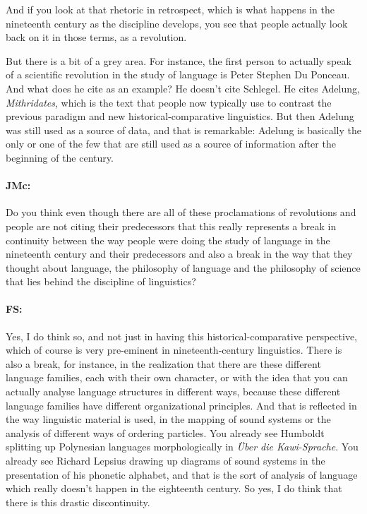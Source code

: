 \documentclass[output=paper]{langscibook}
\begin{document}
And if you look at that rhetoric in retrospect, which is what happens in the nineteenth century as the discipline develops, you see that people actually look back on it in those terms, as a revolution. 

But there is a bit of a grey area. For instance, the first person to actually speak of a scientific revolution in the study of language is Peter Stephen Du Ponceau. And what does he cite as an example? He doesn’t cite Schlegel. He cites Adelung, \textit{Mithridates}, which is the text that people now typically use to contrast the previous paradigm and new historical-comparative linguistics. But then Adelung was still used as a source of data, and that is remarkable: Adelung is basically the only or one of the few that are still used as a source of information after the beginning of the century.


\paragraph*{JMc:}  Do you think even though there are all of these proclamations of revolutions and people are not citing their predecessors that this really represents a break in continuity between the way people were doing the study of language in the nineteenth century and their predecessors and also a break in the way that they thought about language, the philosophy of language and the philosophy of science that lies behind the discipline of linguistics?


\paragraph*{FS:}  Yes, I do think so, and not just in having this historical-comparative perspective, which of course is very pre-eminent in nineteenth-century linguistics. There is also a break, for instance, in the realization that there are these different language families, each with their own character, or with the idea that you can actually analyse language structures in different ways, because these different language families have different organizational principles. And that is reflected in the way linguistic material is used, in the mapping of sound systems or the analysis of different ways of ordering particles. You already see Humboldt splitting up Polynesian languages morphologically in \textit{Über die Kawi-Sprache}. You already see Richard Lepsius drawing up diagrams of sound systems in the presentation of his phonetic alphabet, and that is the sort of analysis of language which really doesn’t happen in the eighteenth century. So yes, I do think that there is this drastic discontinuity.
\end{document}
